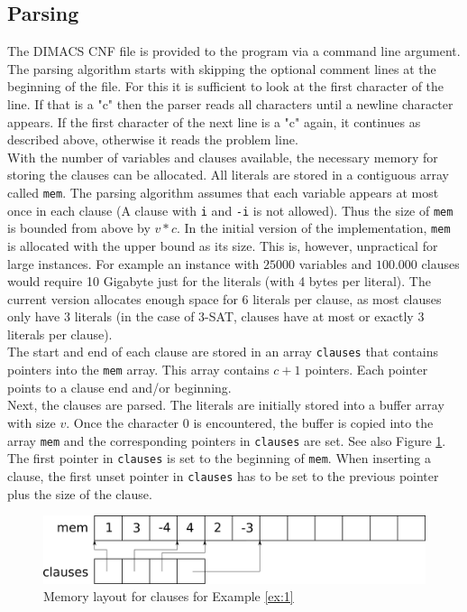\documentclass[12pt,a4paper]{article}
\begin{document}
\subsection{Parsing}
The DIMACS CNF file is provided to the program via a command line argument. The parsing algorithm starts with skipping the optional comment lines at the beginning of the file. For this it is sufficient to look at the first character of the line. If that is a "c" then the parser reads all characters until a newline character appears. If the first character of the next line is  a "c" again, it continues as described above, otherwise it reads the problem line.\\ With the number of variables and clauses available, the necessary memory for storing the clauses can be allocated. All literals are stored in a contiguous array called \texttt{mem}. The parsing algorithm assumes that each variable appears at most once in each clause (A clause with \texttt{i} and \texttt{-i} is not allowed). Thus the size of \texttt{mem} is bounded from above by $v * c$. In the initial version of the implementation, \texttt{mem} is allocated with the upper bound as its size. This is, however, unpractical for large instances. For example an instance with $25000$ variables and $100.000$  clauses would require 10 Gigabyte just for the literals (with 4 bytes per literal). The current version allocates enough space for 6 literals per clause, as most clauses only have 3 literals (in the case of 3-SAT, clauses have at most or exactly 3 literals per clause).\\
The start and end of each clause are stored in an array \texttt{clauses} that contains pointers into the \texttt{mem} array. This array contains $c+1$ pointers. Each pointer points to a clause end and/or beginning.\\

Next, the clauses are parsed. The literals are initially stored into a buffer array with size $v$. Once the character $0$ is encountered, the buffer is copied into the array \texttt{mem} and the corresponding pointers in \texttt{clauses} are set.  See also Figure \ref{fig:mem_clauses}. The first pointer in \texttt{clauses} is set to the beginning of \texttt{mem}. When inserting a clause, the first unset pointer in \texttt{clauses} has to be set to the previous pointer plus the size of the clause.
\begin{figure}
  \centering
  \includegraphics[width=\textwidth]{mem_clauses.png}
  \caption{Memory layout for clauses for Example \ref{ex:1}}
  \label{fig:mem_clauses}
\end{figure}
\end{document}
